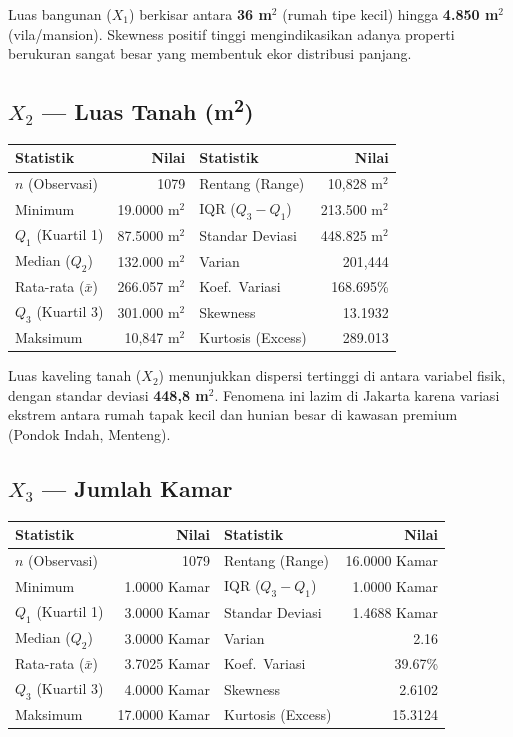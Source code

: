 \documentclass[12pt,a4paper]{article}
\begin{document}
\noindent Luas bangunan ($X_1$) berkisar antara \textbf{36 m$^2$} (rumah tipe kecil) hingga \textbf{4.850 m$^2$} (vila/mansion). Skewness positif tinggi mengindikasikan adanya properti berukuran sangat besar yang membentuk ekor distribusi panjang.


\subsection{\texorpdfstring{$X_2$ --- Luas Tanah (m\textsuperscript{2})}{X2 --- Luas Tanah (m2)}}
\begin{center}
\begin{tabular}{|l|r||l|r|}
\hline
\textbf{Statistik} & \textbf{Nilai} & \textbf{Statistik} & \textbf{Nilai} \\
\hline
$n$ (Observasi) & 1079 & Rentang (Range) & 10,828 m$^2$ \\
Minimum & 19.0000 m$^2$ & IQR ($Q_3 - Q_1$) & 213.500 m$^2$ \\
$Q_1$ (Kuartil 1) & 87.5000 m$^2$ & Standar Deviasi & 448.825 m$^2$ \\
Median ($Q_2$) & 132.000 m$^2$ & Varian & 201,444 \\
Rata-rata ($\bar{x}$) & 266.057 m$^2$ & Koef.~Variasi & 168.695\% \\
$Q_3$ (Kuartil 3) & 301.000 m$^2$ & Skewness & 13.1932 \\
Maksimum & 10,847 m$^2$ & Kurtosis (Excess) & 289.013 \\
\hline
\end{tabular}
\end{center}

\noindent Luas kaveling tanah ($X_2$) menunjukkan dispersi tertinggi di antara variabel fisik, dengan standar deviasi \textbf{448,8 m$^2$}. Fenomena ini lazim di Jakarta karena variasi ekstrem antara rumah tapak kecil dan hunian besar di kawasan premium (Pondok Indah, Menteng).


\subsection{\texorpdfstring{$X_3$}{X3} --- Jumlah Kamar}
\begin{center}
\begin{tabular}{|l|r||l|r|}
\hline
\textbf{Statistik} & \textbf{Nilai} & \textbf{Statistik} & \textbf{Nilai} \\
\hline
$n$ (Observasi) & 1079 & Rentang (Range) & 16.0000 Kamar \\
Minimum & 1.0000 Kamar & IQR ($Q_3 - Q_1$) & 1.0000 Kamar \\
$Q_1$ (Kuartil 1) & 3.0000 Kamar & Standar Deviasi & 1.4688 Kamar \\
Median ($Q_2$) & 3.0000 Kamar & Varian & 2.16 \\
Rata-rata ($\bar{x}$) & 3.7025 Kamar & Koef.~Variasi & 39.67\% \\
$Q_3$ (Kuartil 3) & 4.0000 Kamar & Skewness & 2.6102 \\
Maksimum & 17.0000 Kamar & Kurtosis (Excess) & 15.3124 \\
\hline
\end{tabular}
\end{center}
\end{document}
